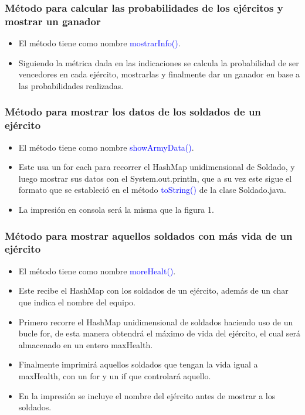\documentclass{article}
\begin{document}
\subsubsection{Método para calcular las probabilidades de los ejércitos y mostrar un ganador}
\begin{itemize}
    \item El método tiene como nombre \textcolor{blue}{mostrarInfo()}.
    \item Siguiendo la métrica dada en las indicaciones se calcula la probabilidad de ser vencedores en cada ejército, mostrarlas y finalmente dar un ganador en base a las probabilidades realizadas.
\end{itemize}



\subsubsection{Método para mostrar los datos de los soldados de un ejército}
\begin{itemize}
    \item El método tiene como nombre \textcolor{blue}{showArmyData()}.
    \item Este usa un for each para recorrer el HashMap unidimensional de Soldado, y luego mostrar sus datos con el System.out.println, que a su vez este sigue el formato que se estableció en el método \textcolor{blue}{toString()} de la clase Soldado.java.
    \item La impresión en consola será la misma que la figura 1.
\end{itemize}





\subsubsection{Método para mostrar aquellos soldados con más vida de un ejército}
\begin{itemize}
    \item El método tiene como nombre \textcolor{blue}{moreHealt()}.
    \item Este recibe el HashMap con los soldados de un ejército, además de un char que indica el nombre del equipo.
    \item Primero recorre el HashMap unidimensional de soldados haciendo uso de un bucle for, de esta manera obtendrá el máximo de vida del ejército, el cual será almacenado en un entero maxHealth.
    \item Finalmente imprimirá aquellos soldados que tengan la vida igual a maxHealth, con un for y un if que controlará aquello.
    \item En la impresión se incluye el nombre del ejército antes de mostrar a los soldados.
\end{itemize}

\end{document}
